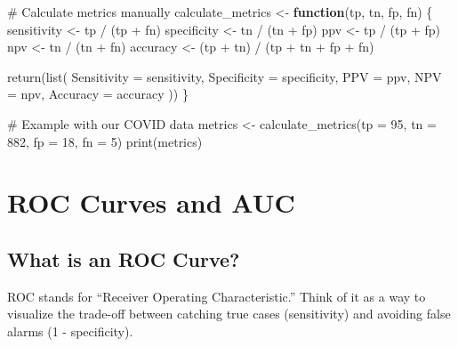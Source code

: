 \documentclass[
  11pt,
  letterpaper,
  oneside]{book}
\newenvironment{Shaded}{\begin{snugshade}}{\end{snugshade}}
\newcommand{\AttributeTok}[1]{\textcolor[rgb]{0.40,0.45,0.13}{#1}}
\newcommand{\CommentTok}[1]{\textcolor[rgb]{0.37,0.37,0.37}{#1}}
\newcommand{\ControlFlowTok}[1]{\textcolor[rgb]{0.00,0.23,0.31}{\textbf{#1}}}
\newcommand{\DecValTok}[1]{\textcolor[rgb]{0.68,0.00,0.00}{#1}}
\newcommand{\FunctionTok}[1]{\textcolor[rgb]{0.28,0.35,0.67}{#1}}
\newcommand{\NormalTok}[1]{\textcolor[rgb]{0.00,0.23,0.31}{#1}}
\newcommand{\OtherTok}[1]{\textcolor[rgb]{0.00,0.23,0.31}{#1}}
\newcommand{\SpecialCharTok}[1]{\textcolor[rgb]{0.37,0.37,0.37}{#1}}
\begin{document}
\begin{Shaded}
\begin{Highlighting}[]
\CommentTok{\# Calculate metrics manually}
\NormalTok{calculate\_metrics }\OtherTok{\textless{}{-}} \ControlFlowTok{function}\NormalTok{(tp, tn, fp, fn) \{}
\NormalTok{  sensitivity }\OtherTok{\textless{}{-}}\NormalTok{ tp }\SpecialCharTok{/}\NormalTok{ (tp }\SpecialCharTok{+}\NormalTok{ fn)}
\NormalTok{  specificity }\OtherTok{\textless{}{-}}\NormalTok{ tn }\SpecialCharTok{/}\NormalTok{ (tn }\SpecialCharTok{+}\NormalTok{ fp)}
\NormalTok{  ppv }\OtherTok{\textless{}{-}}\NormalTok{ tp }\SpecialCharTok{/}\NormalTok{ (tp }\SpecialCharTok{+}\NormalTok{ fp)}
\NormalTok{  npv }\OtherTok{\textless{}{-}}\NormalTok{ tn }\SpecialCharTok{/}\NormalTok{ (tn }\SpecialCharTok{+}\NormalTok{ fn)}
\NormalTok{  accuracy }\OtherTok{\textless{}{-}}\NormalTok{ (tp }\SpecialCharTok{+}\NormalTok{ tn) }\SpecialCharTok{/}\NormalTok{ (tp }\SpecialCharTok{+}\NormalTok{ tn }\SpecialCharTok{+}\NormalTok{ fp }\SpecialCharTok{+}\NormalTok{ fn)}

  \FunctionTok{return}\NormalTok{(}\FunctionTok{list}\NormalTok{(}
    \AttributeTok{Sensitivity =}\NormalTok{ sensitivity,}
    \AttributeTok{Specificity =}\NormalTok{ specificity,}
    \AttributeTok{PPV =}\NormalTok{ ppv,}
    \AttributeTok{NPV =}\NormalTok{ npv,}
    \AttributeTok{Accuracy =}\NormalTok{ accuracy}
\NormalTok{  ))}
\NormalTok{\}}

\CommentTok{\# Example with our COVID data}
\NormalTok{metrics }\OtherTok{\textless{}{-}} \FunctionTok{calculate\_metrics}\NormalTok{(}\AttributeTok{tp =} \DecValTok{95}\NormalTok{, }\AttributeTok{tn =} \DecValTok{882}\NormalTok{, }\AttributeTok{fp =} \DecValTok{18}\NormalTok{, }\AttributeTok{fn =} \DecValTok{5}\NormalTok{)}
\FunctionTok{print}\NormalTok{(metrics)}
\end{Highlighting}
\end{Shaded}

\section{ROC Curves and AUC}\label{roc-curves-and-auc}

\subsection{What is an ROC Curve?}\label{what-is-an-roc-curve}

ROC stands for ``Receiver Operating Characteristic.'' Think of it as a
way to visualize the trade-off between catching true cases (sensitivity)
and avoiding false alarms (1 - specificity).
\end{document}
